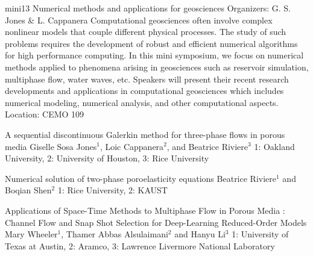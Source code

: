 \mini
{mini13}
{Numerical methods and applications for geosciences}
{Organizers: G. S. Jones \& L. Cappanera}
{Computational geosciences often involve complex nonlinear models that couple different physical processes. The study of such problems requires the development of robust and efficient numerical algorithms for high performance computing. In this mini symposium, we focus on numerical methods applied to phenomena arising in geosciences such as reservoir simulation, multiphase flow, water waves, etc. Speakers will present their recent research developments and applications in computational geosciences which includes numerical modeling, numerical analysis, and other computational aspects.}
{Location: CEMO 109}

\begin{talks}
\item\talk
{A sequential discontinuous Galerkin method for three-phase flows in porous media}
{Giselle Sosa Jones$^{1}$, Loic Cappanera$^{2}$, and Beatrice Riviere$^{3}$}
{1: Oakland University, 2: University of Houston, 3: Rice University}
\item\talk
{Numerical solution of two-phase poroelasticity equations}
{Beatrice Riviere$^{1}$ and Boqian Shen$^{2}$}
{1: Rice University, 2: KAUST}
\item\talk
{Applications of Space-Time Methods to Multiphase Flow in Porous Media  :  Channel Flow and  Snap Shot Selection for Deep-Learning Reduced-Order Models }
{Mary Wheeler$^{1}$, Thamer  Abbas Alsulaimani$^{2}$ and Hanyu Li$^{3}$}
{1: University of Texas at Austin, 2: Aramco, 3: Lawrence Livermore National Laboratory}
\end{talks}
\room
